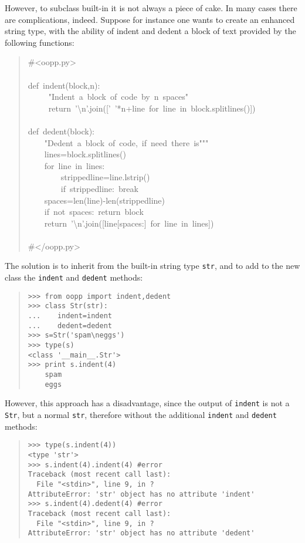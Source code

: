 \documentclass[10pt,english]{article}
\begin{document}
However, to subclass built-in it is not always a piece of cake. In
many cases there are complications, indeed. Suppose for instance
one wants to create an enhanced string type, with
the ability of indent and dedent a block of text provided by 
the following functions:
\begin{quote}
\begin{ttfamily}\begin{flushleft}
\mbox{{\#}<oopp.py>}\\
\mbox{}\\
\mbox{def~indent(block,n):}\\
\mbox{~~~~~"Indent~a~block~of~code~by~n~spaces"}\\
\mbox{~~~~~return~'{\textbackslash}n'.join(['~'*n+line~for~line~in~block.splitlines()])}\\
\mbox{}\\
\mbox{def~dedent(block):}\\
\mbox{~~~~"Dedent~a~block~of~code,~if~need~there~is"""}\\
\mbox{~~~~lines=block.splitlines()}\\
\mbox{~~~~for~line~in~lines:}\\
\mbox{~~~~~~~~strippedline=line.lstrip()}\\
\mbox{~~~~~~~~if~strippedline:~break}\\
\mbox{~~~~spaces=len(line)-len(strippedline)}\\
\mbox{~~~~if~not~spaces:~return~block}\\
\mbox{~~~~return~'{\textbackslash}n'.join([line[spaces:]~for~line~in~lines])}\\
\mbox{}\\
\mbox{{\#}</oopp.py>}
\end{flushleft}\end{ttfamily}
\end{quote}

The solution is to inherit from the built-in string type \texttt{str}, and to 
add to the new class the \texttt{indent} and \texttt{dedent} methods:
\begin{quote}
\begin{verbatim}>>> from oopp import indent,dedent
>>> class Str(str):
...    indent=indent
...    dedent=dedent
>>> s=Str('spam\neggs')
>>> type(s)
<class '__main__.Str'>
>>> print s.indent(4)
    spam
    eggs\end{verbatim}
\end{quote}

However, this approach has a disadvantage, since the output of \texttt{indent} is
not a \texttt{Str}, but a normal \texttt{str}, therefore without the additional 
\texttt{indent} and \texttt{dedent} methods:
\begin{quote}
\begin{verbatim}>>> type(s.indent(4))
<type 'str'>
>>> s.indent(4).indent(4) #error
Traceback (most recent call last):
  File "<stdin>", line 9, in ?
AttributeError: 'str' object has no attribute 'indent'
>>> s.indent(4).dedent(4) #error
Traceback (most recent call last):
  File "<stdin>", line 9, in ?
AttributeError: 'str' object has no attribute 'dedent'\end{verbatim}
\end{quote}
\end{document}
